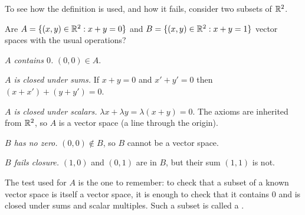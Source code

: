 To see how the definition is used, and how it fails, consider two subsets of $\mathbb{R}^2$.

\begin{example}\label{ex:vs-nonexample}
  Are $A=\{(x,y)\in\mathbb{R}^2: x+y=0\}$ and $B=\{(x,y)\in\mathbb{R}^2:x+y=1\}$ vector spaces with the usual operations?
\end{example}
\begin{solution}
  \begin{steps}
    \item \emph{$A$ contains $0$.} $(0,0)\in A$.
    \item \emph{$A$ is closed under sums.} If $x+y=0$ and $x'+y'=0$ then $(x+x')+(y+y')=0$.
    \item \emph{$A$ is closed under scalars.} $\lambda x+\lambda y=\lambda(x+y)=0$. The axioms are inherited from $\mathbb{R}^2$, so $A$ is a vector space (a line through the origin).
    \item \emph{$B$ has no zero.} $(0,0)\notin B$, so $B$ cannot be a vector space.
    \item \emph{$B$ fails closure.} $(1,0)$ and $(0,1)$ are in $B$, but their sum $(1,1)$ is not.
  \end{steps}
\end{solution}

The test used for $A$ is the one to remember: to check that a subset of a known vector space is itself a vector space, it is enough to check that it contains $0$ and is closed under sums and scalar multiples. Such a subset is called a .

